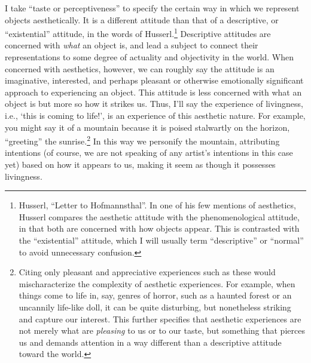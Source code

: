 I take ``taste or perceptiveness'' to specify the certain way in which
we represent objects aesthetically. It is a different attitude than that
of a descriptive, or ``existential'' attitude, in the words of
Husserl.\footnote{Husserl, ``Letter to Hofmannsthal''. In one of his few
  mentions of aesthetics, Husserl compares the aesthetic attitude with
  the phenomenological attitude, in that both are concerned with how
  objects appear. This is contrasted with the ``existential'' attitude,
  which I will usually term ``descriptive'' or ``normal'' to avoid
  unnecessary confusion.} Descriptive attitudes are concerned with
\emph{what} an object is, and lead a subject to connect their
representations to some degree of actuality and objectivity in the
world. When concerned with aesthetics, however, we can roughly say the
attitude is an imaginative, interested, and perhaps pleasant or
otherwise emotionally significant approach to experiencing an object.
This attitude is less concerned with what an object is but more so how
it strikes us. Thus, I'll say the experience of livingness, i.e., `this
is coming to life!', is an experience of this aesthetic nature. For
example, you might say it of a mountain because it is poised stalwartly
on the horizon, ``greeting'' the sunrise.\footnote{Citing only pleasant
  and appreciative experiences such as these would mischaracterize the
  complexity of aesthetic experiences. For example, when things come to
  life in, say, genres of horror, such as a haunted forest or an
  uncannily life-like doll, it can be quite disturbing, but nonetheless
  striking and capture our interest. This further specifies that
  aesthetic experiences are not merely what are \emph{pleasing} to us or
  to our taste, but something that pierces us and demands attention in a
  way different than a descriptive attitude toward the world.} In this
way we personify the mountain, attributing intentions (of course, we are
not speaking of any artist's intentions in this case yet) based on how
it appears to us, making it seem as though it possesses livingness.

